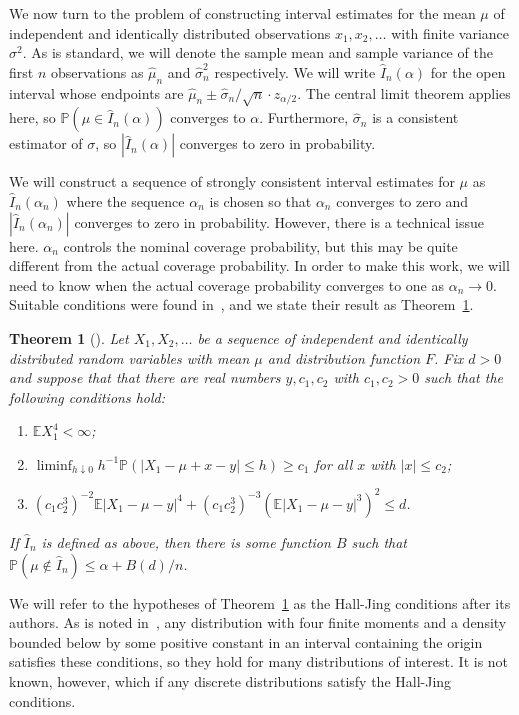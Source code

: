 \documentclass[12pt]{article}
\newcommand{\prob}[1]{\mathbb{P}(#1)}
\newtheorem{theorem}{Theorem}
\numberwithin{theorem}{section}
\begin{document}
We now turn to the problem of constructing interval estimates for the mean $\mu$ of independent and identically distributed observations $x_1, x_2, \dots$ with finite variance $\sigma^2$.  As is standard, we will denote the sample mean and sample variance of the first $n$ observations as $\hat{\mu}_n$ and $\hat{\sigma}_n^2$ respectively.  We will write $\hat{I}_n(\alpha)$ for the open interval whose endpoints are $\hat{\mu}_n \pm \hat{\sigma}_n / \sqrt{n} \cdot z_{\alpha / 2}$.  The central limit theorem applies here, so $\prob{\mu \in \hat{I}_n(\alpha)}$ converges to $\alpha$.  Furthermore, $\hat{\sigma}_n$ is a consistent estimator of $\sigma$, so $|\hat{I}_n(\alpha)|$ converges to zero in probability.

We will construct a sequence of strongly consistent interval estimates for $\mu$ as $\hat{I}_n(\alpha_n)$ where the sequence $\alpha_n$ is chosen so that $\alpha_n$ converges to zero and $|\hat{I}_n(\alpha_n)|$ converges to zero in probability.  However, there is a technical issue here.  $\alpha_n$ controls the nominal coverage probability, but this may be quite different from the actual coverage probability.  In order to make this work, we will need to know when the actual coverage probability converges to one as $\alpha_n \rightarrow 0$.  Suitable conditions were found in~\cite{hall1995coverage}, and we state their result as Theorem~\ref{thm_hall_jing}.

\begin{theorem}[\cite{hall1995coverage}]
\label{thm_hall_jing}
Let $X_1, X_2, \dots$ be a sequence of independent and identically distributed random variables with mean $\mu$ and distribution function $F$.  Fix $d > 0$ and suppose that that there are real numbers $y, c_1, c_2$ with $c_1, c_2 > 0$ such that the following conditions hold:
\begin{enumerate}
\item $\mathbb{E}X_1^4 < \infty$;
\item $\displaystyle \liminf_{h \downarrow 0} h^{-1}\prob{|X_1 - \mu + x - y| \leq h} \geq c_1$ for all $x$ with $|x| \leq c_2$;
\item $(c_1c_2^3)^{-2}\mathbb{E}|X_1 - \mu - y|^4 + (c_1c_2^3)^{-3}(\mathbb{E}|X_1 - \mu - y|^3)^2 \leq d$.
\end{enumerate}
If $\hat{I}_n$ is defined as above, then there is some function $B$ such that $\prob{\mu \notin \hat{I}_n} \leq \alpha + B(d) / n$.
\end{theorem}
\noindent
We will refer to the hypotheses of Theorem~\ref{thm_hall_jing} as the Hall-Jing conditions after its authors.  As is noted in~\cite{hall1995coverage}, any distribution with four finite moments and a density bounded below by some positive constant in an interval containing the origin satisfies these conditions, so they hold for many distributions of interest.  It is not known, however, which if any discrete distributions satisfy the Hall-Jing conditions.
\end{document}
